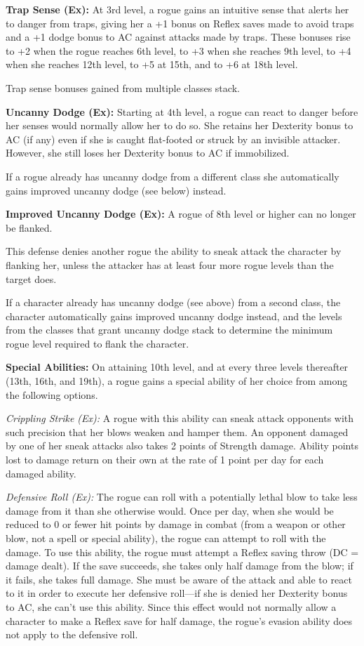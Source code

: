 \textbf{Trap Sense (Ex):} At 3rd level, a rogue gains an intuitive sense that alerts 
her to danger from traps, giving her a +1 bonus on Reflex saves made to avoid traps 
and a +1 dodge bonus to AC against attacks made by traps. These bonuses rise to 
+2 when the rogue reaches 6th level, to +3 when she reaches 9th level, to +4 when 
she reaches 12th level, to +5 at 15th, and to +6 at 18th level.

Trap sense bonuses gained from multiple classes stack.

\textbf{Uncanny Dodge (Ex):} Starting at 4th level, a rogue can react to danger 
before her senses would normally allow her to do so. She retains her Dexterity 
bonus to AC (if any) even if she is caught flat-footed or struck by an invisible 
attacker. However, she still loses her Dexterity bonus to AC if immobilized.

If a rogue already has uncanny dodge from a different class she automatically gains 
improved uncanny dodge (see below) instead.

\textbf{Improved Uncanny Dodge (Ex):} A rogue of 8th level or higher can no longer 
be flanked.

This defense denies another rogue the ability to sneak attack the character by 
flanking her, unless the attacker has at least four more rogue levels than the 
target does.

If a character already has uncanny dodge (see above) from a second class, the character 
automatically gains improved uncanny dodge instead, and the levels from the classes 
that grant uncanny dodge stack to determine the minimum rogue level required to 
flank the character.

\textbf{Special Abilities:} On attaining 10th level, and at every three levels 
thereafter (13th, 16th, and 19th), a rogue gains a special ability of her choice 
from among the following options.

\textit{Crippling Strike (Ex):} A rogue with this ability can sneak attack opponents 
with such precision that her blows weaken and hamper them. An opponent damaged 
by one of her sneak attacks also takes 2 points of Strength damage. Ability points 
lost to damage return on their own at the rate of 1 point per day for each damaged 
ability.

\textit{Defensive Roll (Ex):} The rogue can roll with a potentially lethal blow 
to take less damage from it than she otherwise would. Once per day, when she would 
be reduced to 0 or fewer hit points by damage in combat (from a weapon or other 
blow, not a spell or special ability), the rogue can attempt to roll with the damage. 
To use this ability, the rogue must attempt a Reflex saving throw (DC = damage 
dealt). If the save succeeds, she takes only half damage from the blow; if it fails, 
she takes full damage. She must be aware of the attack and able to react to it 
in order to execute her defensive roll---if she is denied her Dexterity bonus to 
AC, she can't use this ability. Since this effect would not normally allow a character 
to make a Reflex save for half damage, the rogue's evasion ability does not apply 
to the defensive roll.


